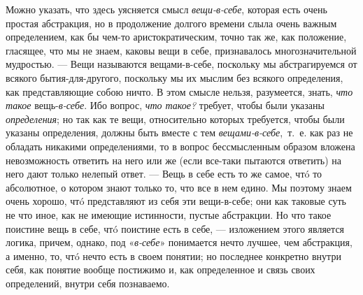 Можно указать, что здесь уясняется смысл
{\em вещи-в-себе}, которая есть очень простая
абстракция, но в продолжение долгого времени слыла очень важным
определением, как бы чем-то аристократическим, точно так же, как положение,
гласящее, что мы не знаем, каковы вещи в себе, признавалось
многозначительной мудростью. — Вещи называются вещами-в-себе, поскольку мы
абстрагируемся от всякого бытия-для-другого, поскольку мы их мыслим без
всякого определения, как представляющие собою ничто. В этом смысле нельзя,
разумеется, знать, {\em что такое}
вещь-{\em в-себе}. Ибо вопрос,
{\em что такое?} требует, чтобы были указаны
{\em определения}; но так как те вещи, относительно
которых требуется, чтобы были указаны определения, должны быть вместе с тем
{\em вещами-в-себе},~т.~е. как раз не обладать никакими
определениями, то в вопрос бессмысленным образом вложена невозможность
ответить на него или же (если все-таки пытаются ответить) на него дают
только нелепый ответ. — Вещь в себе есть то же самое, чтó то абсолютное, о
котором знают только то, что все в нем едино. Мы поэтому знаем очень
хорошо, чтó представляют из себя эти вещи-в-себе; они как таковые суть не
что иное, как не имеющие истинности, пустые абстракции. Но что такое
поистине вещь в себе, чтó поистине есть в себе, — изложением этого является
логика, причем, однако, под «{\em в-себе}» понимается
нечто лучшее, чем абстракция, а именно, то, чтó нечто есть в своем понятии;
но последнее конкретно внутри себя, как понятие вообще постижимо и, как
определенное и связь своих определений, внутри себя познаваемо.

